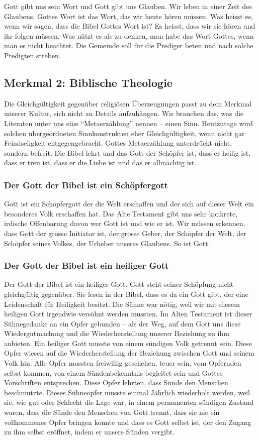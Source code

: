 \documentclass{../../inc/mybib}
\begin{document}
Gott gibt uns sein Wort und Gott gibt uns Glauben. Wir leben in einer Zeit des Glaubens. Gottes Wort ist das Wort, das wir heute hören müssen. Was heisst es, wenn wir sagen, dass die Bibel Gottes Wort ist? Es heisst, dass wir sie hören und ihr folgen müssen. Was nützt es als zu denken, man habe das Wort Gottes, wenn man es nicht beachtet. Die Gemeinde soll für die Prediger beten und nach solche Predigten streben.
\subsection*{Merkmal 2: Biblische Theologie}
Die Gleichgültigkeit gegenüber religiösen Überzeugungen passt zu dem Merkmal unserer Kultur, sich nicht an Details aufzuhängen. Wir brauchen das, was die Literaten unter uns eine \enquote{Metaerzählung} nennen -- einen Sinn. Heutzutage wird solchen übergeordneten Sinnkonstrukten eher Gleichgültigkeit, wenn nicht gar Feindseligkeit entgegengebracht.
Gottes Metaerzählung unterdrückt nicht, sondern befreit. Die Bibel lehrt und das Gott der Schöpfer ist, dass er heilig ist, dass er treu ist, dass er die Liebe ist und das er allmächtig ist.
\subsubsection*{Der Gott der Bibel ist ein Schöpfergott}
Gott ist ein Schöpfergott der die Welt erschaffen und der sich auf dieser Welt ein besonderes Volk erschaffen hat. Das Alte Testament gibt uns sehr konkrete, irdische Offenbarung davon wer Gott ist und wie er ist. Wir müssen erkennen, dass Gott der grosse Initiator ist, der grosse Geber, der Schöpfer der Welt, der Schöpfer seines Volkes, der Urheber unseres Glaubens. So ist Gott.
\subsubsection*{Der Gott der Bibel ist ein heiliger Gott}
Der Gott der Bibel ist ein heiliger Gott. Gott steht seiner Schöpfung nicht gleichgültig gegenüber. Sie lesen in der Bibel, dass es da ein Gott gibt, der eine Leidenschaft für Heiligkeit besitzt.
Die Sühne war nötig, weil wir mit diesem heiligen Gott irgendwie versöhnt werden mussten. Im Alten Testament ist dieser Sühnegedanke an ein Opfer gebunden -- als der Weg, auf dem Gott uns diese Wiedergutmachung und die Wiederherstellung unserer Beziehung zu ihm anbieten. Ein heiliger Gott musste von einem sündigen Volk getrennt sein. Diese Opfer wiesen auf die Wiederherstellung der Beziehung zwischen Gott und seinem Volk hin. Alle Opfer mussten freiwillig geschehen, teuer sein, vom Opfernden selbst kommen, von einem Sündenbekenntnis begleitet sein und Gottes Vorschriften entsprechen. Diese Opfer lehrten, dass Sünde den Menschen beschmutzte. Dieses Sühneopfer musste einmal Jährlich wiederholt werden, weil sie, wie gut oder Schlecht die Lage war, in einem permanenten sündigen Zustand waren, dass die Sünde den Menschen von Gott trennt, dass sie nie ein vollkommenes Opfer bringen konnte und dass es Gott selbst ist, der den Zugang zu ihm selbst eröffnet, indem er unsere Sünden vergibt.
\end{document}
